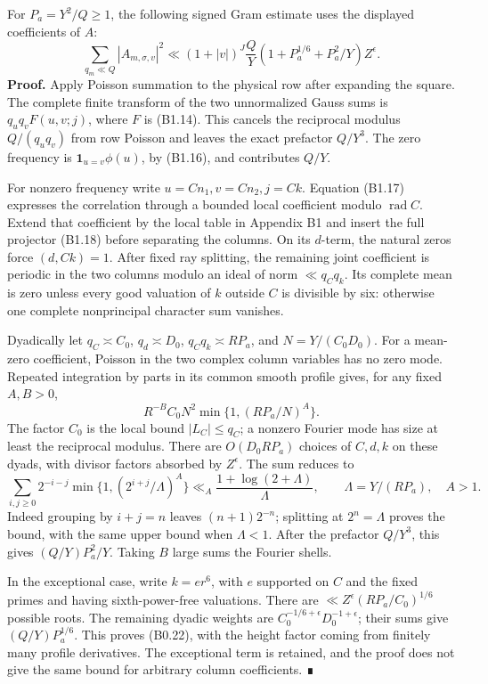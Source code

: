 \documentclass[11pt,a4paper]{article}
\begin{document}
For \(P_a=Y^2/Q\ge1\), the following signed Gram estimate uses the
displayed coefficients of \(A\): \[
\sum_{q_m\ll Q}|A_{m,\sigma,v}|^2
\ll(1+|v|)^J\frac QY\left(1+P_a^{1/6}+P_a^2/Y\right)Z^\epsilon.
\tag{B0.22}
\] \textbf{Proof.} Apply Poisson summation to the physical row after
expanding the square. The complete finite transform of the two
unnormalized Gauss sums is \(q_uq_vF(u,\allowbreak{}v;j)\), where \(F\) is (B1.14).
This cancels the reciprocal modulus \(Q/(q_uq_v)\) from row Poisson and
leaves the exact prefactor \(Q/Y^3\). The zero frequency is
\(\mathbf1_{u=v}\phi(u)\), by (B1.16), and contributes \(Q/Y\).

For nonzero frequency write \(u=Cn_1,\allowbreak{}v=Cn_2,\allowbreak{}j=Ck\). Equation (B1.17)
expresses the correlation through a bounded local coefficient modulo
\(\operatorname{rad}C\). Extend that coefficient by the local table in
Appendix B1 and insert the full projector (B1.18) before separating the
columns. On its \(d\)-term, the natural zeros force \((d,\allowbreak{}Ck)=1\). After
fixed ray splitting, the remaining joint coefficient is periodic in the
two columns modulo an ideal of norm \(\ll q_Cq_k\). Its complete mean is
zero unless every good valuation of \(k\) outside \(C\) is divisible by
six: otherwise one complete nonprincipal character sum vanishes.

Dyadically let \(q_C\asymp C_0\), \(q_d\asymp D_0\),
\(q_Cq_k\asymp R P_a\), and \(N=Y/(C_0D_0)\). For a mean-zero
coefficient, Poisson in the two complex column variables has no zero
mode. Repeated integration by parts in its common smooth profile gives,
for any fixed \(A,\allowbreak{}B>0\), \[
R^{-B}C_0N^2\min\{1,(RP_a/N)^A\}.
\tag{B0.23}
\] The factor \(C_0\) is the local bound \(|L_C|\le q_C\); a nonzero
Fourier mode has size at least the reciprocal modulus. There are
\(O(D_0RP_a)\) choices of \(C,\allowbreak{}d,\allowbreak{}k\) on these dyads, with divisor factors
absorbed by \(Z^\epsilon\). The sum reduces to \[
\sum_{i,j\ge0}2^{-i-j}\min\{1,(2^{i+j}/\Lambda)^A\}
\ll_A\frac{1+\log(2+\Lambda)}\Lambda,\qquad
\Lambda=Y/(RP_a),\quad A>1.
\tag{B0.24}
\] Indeed grouping by \(i+j=n\) leaves \((n+1)2^{-n}\); splitting at
\(2^n=\Lambda\) proves the bound, with the same upper bound when
\(\Lambda<1\). After the prefactor \(Q/Y^3\), this gives
\((Q/Y)P_a^2/Y\). Taking \(B\) large sums the Fourier shells.

In the exceptional case, write \(k=e r^6\), with \(e\) supported on
\(C\) and the fixed primes and having sixth-power-free valuations. There
are \(\ll Z^\epsilon(RP_a/C_0)^{1/6}\) possible roots. The remaining
dyadic weights are \(C_0^{-1/6+\epsilon}D_0^{-1+\epsilon}\); their sums
give \((Q/Y)P_a^{1/6}\). This proves (B0.22), with the height factor
coming from finitely many profile derivatives. The exceptional term is
retained, and the proof does not give the same bound for arbitrary
column coefficients. ∎
\end{document}
